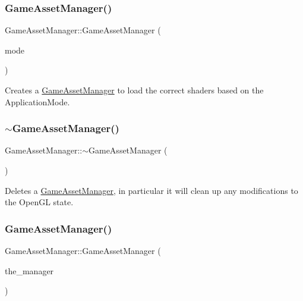 \subsubsection{\texorpdfstring{Game\+Asset\+Manager()}{GameAssetManager()}\hspace{0.1cm}{\footnotesize\ttfamily [1/3]}}
{\footnotesize\ttfamily Game\+Asset\+Manager\+::\+Game\+Asset\+Manager (\begin{DoxyParamCaption}\item[{Application\+Mode}]{mode }\end{DoxyParamCaption})\hspace{0.3cm}{\ttfamily [explicit]}}

Creates a \hyperlink{classGameAssetManager}{Game\+Asset\+Manager} to load the correct shaders based on the Application\+Mode. \mbox{\label{classGameAssetManager_a1270bd61ecbcca563f079803e40c9b77}} 
\subsubsection{\texorpdfstring{$\sim$\+Game\+Asset\+Manager()}{~GameAssetManager()}}
{\footnotesize\ttfamily Game\+Asset\+Manager\+::$\sim$\+Game\+Asset\+Manager (\begin{DoxyParamCaption}{ }\end{DoxyParamCaption})\hspace{0.3cm}{\ttfamily [virtual]}}

Deletes a \hyperlink{classGameAssetManager}{Game\+Asset\+Manager}, in particular it will clean up any modifications to the Open\+GL state. \mbox{\label{classGameAssetManager_a2c9adcb72faa154c87eadc9bafe5269d}} 
\subsubsection{\texorpdfstring{Game\+Asset\+Manager()}{GameAssetManager()}\hspace{0.1cm}{\footnotesize\ttfamily [2/3]}}
{\footnotesize\ttfamily Game\+Asset\+Manager\+::\+Game\+Asset\+Manager (\begin{DoxyParamCaption}\item[{\hyperlink{classGameAssetManager}{Game\+Asset\+Manager} const \&}]{the\+\_\+manager }\end{DoxyParamCaption})}

